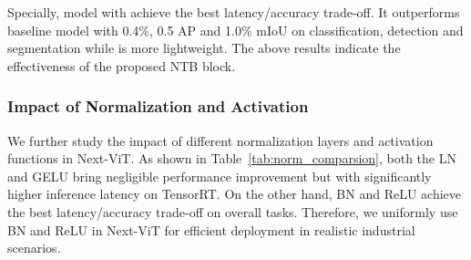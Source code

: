 \documentclass[10pt,twocolumn,letterpaper]{article}
\begin{document}
Specially, model with  achieve the best latency/accuracy trade-off. It outperforms baseline model  with 0.4\%, 0.5 AP and 1.0\% mIoU on classification, detection and segmentation while is more lightweight.
The above results indicate the effectiveness of the proposed NTB block.


\subsubsection{Impact of Normalization and Activation}
 We further study the impact of different normalization layers and activation functions in Next-ViT. As shown in Table~\ref{tab:norm_comparsion}, both the LN and GELU bring negligible performance improvement but with significantly higher inference latency on TensorRT. On the other hand, BN and ReLU achieve the best latency/accuracy trade-off on overall tasks. 
 Therefore, we uniformly use BN and ReLU in Next-ViT for efficient deployment in realistic industrial scenarios.
 



\begin{table}[]
    \centering\caption{Comparison of different convolution blocks.}
    \label{tab:block_comparsion}
\end{table}
\end{document}
